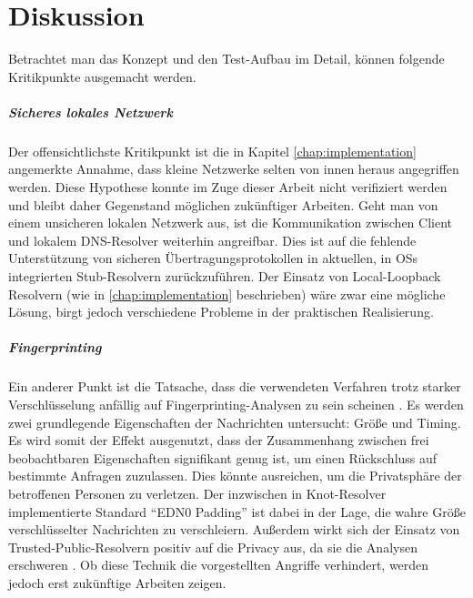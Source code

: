\chapter{Diskussion}
Betrachtet man das Konzept und den Test-Aufbau im Detail, können folgende Kritikpunkte ausgemacht werden. 

\paragraph{Sicheres lokales Netzwerk}
Der offensichtlichste Kritikpunkt ist die in Kapitel \ref{chap:implementation} angemerkte Annahme, dass kleine Netzwerke selten von innen heraus angegriffen werden. Diese Hypothese konnte im Zuge dieser Arbeit nicht verifiziert werden und bleibt daher Gegenstand möglichen zukünftiger Arbeiten. Geht man von einem unsicheren lokalen Netzwerk aus, ist die Kommunikation zwischen Client und lokalem DNS-Resolver weiterhin angreifbar. Dies ist auf die fehlende Unterstützung von sicheren Übertragungsprotokollen in aktuellen, in \acp{OS} integrierten Stub-Resolvern zurückzuführen. Der Einsatz von Local-Loopback Resolvern (wie in \ref{chap:implementation} beschrieben) wäre zwar eine mögliche Lösung, birgt jedoch verschiedene Probleme in der praktischen Realisierung.

\paragraph{Fingerprinting}
Ein anderer Punkt ist die Tatsache, dass die verwendeten Verfahren trotz starker Verschlüsselung anfällig auf Fingerprinting-Analysen zu sein scheinen \cite{Shulman2014}\cite{Siby2018}. Es werden zwei grundlegende Eigenschaften der Nachrichten untersucht: Größe und Timing. Es wird somit der Effekt ausgenutzt, dass der Zusammenhang zwischen frei beobachtbaren Eigenschaften signifikant genug ist, um einen Rückschluss auf bestimmte Anfragen zuzulassen. Dies könnte ausreichen, um die Privatsphäre der betroffenen Personen zu verletzen. Der inzwischen in Knot-Resolver implementierte Standard ``EDN0 Padding''\cite{rfc7830} ist dabei in der Lage, die wahre Größe verschlüsselter Nachrichten zu verschleiern. Außerdem wirkt sich der Einsatz von Trusted-Public-Resolvern positiv auf die Privacy aus, da sie die Analysen erschweren \cite{Shulman2014}. Ob diese Technik die vorgestellten Angriffe verhindert, werden jedoch erst zukünftige Arbeiten zeigen. 

